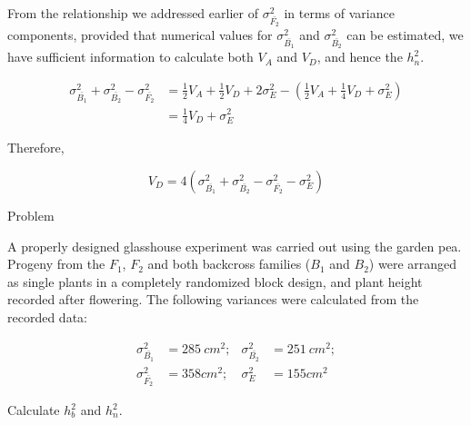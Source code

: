 \documentclass[11pt,dvipsnames,ignorenonframetext,aspectratio=169]{beamer}
\begin{document}
\begin{frame}{}
\protect\hypertarget{section-13}{}

From the relationship we addressed earlier of \(\sigma_{\bar{F_2}}^2\)
in terms of variance components, provided that numerical values for
\(\sigma_{\bar{B_1}}^2\) and \(\sigma_{\bar{B_2}}^2\) can be estimated,
we have sufficient information to calculate both \(V_A\) and \(V_D\),
and hence the \(h_n^2\).

\[
\begin{aligned}
\sigma_{\bar{B_1}}^2 + \sigma_{\bar{B_2}}^2 - \sigma_{\bar{F_2}}^2 &= \frac{1}{2}V_A + \frac{1}{2}V_D + 2\sigma_E^2 - \left(\frac{1}{2}V_A + \frac{1}{4}V_D + \sigma_E^2\right) \\
&= \frac{1}{4}V_D + \sigma_E^2
\end{aligned}
\]

Therefore,

\[
V_D = 4\left(\sigma_{\bar{B_1}}^2 + \sigma_{\bar{B_2}}^2 - \sigma_{\bar{F_2}}^2 - \sigma_E^2 \right)
\tag{vii}
\]

\end{frame}

\begin{frame}{Problem}
\protect\hypertarget{problem-1}{}

A properly designed glasshouse experiment was carried out using the
garden pea. Progeny from the \(F_1\), \(F_2\) and both backcross
families (\(B_1\) and \(B_2\)) were arranged as single plants in a
completely randomized block design, and plant height recorded after
flowering. The following variances were calculated from the recorded
data:

\[
\begin{aligned}
\sigma_{\bar{B_1}}^2 &= 285~cm^2; & \sigma_{\bar{B_2}}^2 &= 251~cm^2; \\
\sigma_{\bar{F_2}}^2 &= 358 cm^2; & \sigma_E^2 &= 155 cm^2
\end{aligned}
\]

Calculate \(h_b^2\) and \(h_n^2\).

\end{frame}
\end{document}
